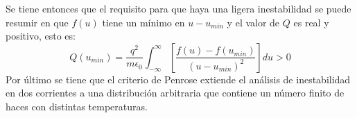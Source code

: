 \documentclass[../tesis_main_file.tex]{subfile}
\begin{document}
Se tiene entonces que el requisito para que haya una ligera inestabilidad se puede resumir en que $f(u)$ tiene un mínimo en  $u-u_{min}$ y el valor de $Q$ es real y positivo, esto es:
\begin{equation}
\label{eq:criterio_Penrose}
Q(u_{min})=\frac{q^2}{m\epsilon _0}\int ^{\infty}_{-\infty}\left[\frac{f(u)-f(u_{min})}{(u-u_{min})^2}\right]du > 0
\end{equation}
Por último se tiene que el criterio de Penrose extiende el análisis de inestabilidad en dos corrientes a una distribución arbitraria que contiene un número finito de haces con distintas temperaturas.
%
\end{document}
